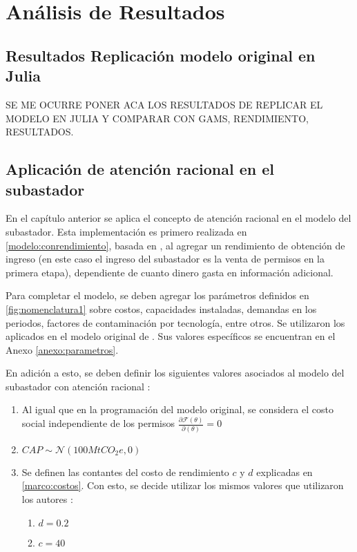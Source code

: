 
\chapter{Análisis de Resultados}
\label{c4} %

\section{Resultados Replicación modelo original en Julia}

SE ME OCURRE PONER ACA LOS RESULTADOS DE REPLICAR EL MODELO EN JULIA Y COMPARAR CON GAMS, RENDIMIENTO, RESULTADOS.

\section{Aplicación de atención racional en el subastador}

En el capítulo anterior se aplica el concepto de atención racional en el modelo del subastador. Esta implementación es primero realizada en \ref{modelo:conrendimiento}, basada en \cite{dewan_estimating_2020}, al agregar un rendimiento de obtención de ingreso (en este caso el ingreso del subastador es la venta de permisos en la primera etapa), dependiente de cuanto dinero gasta en información adicional.
\vspace{2.5mm}

Para completar el modelo, se deben agregar los parámetros definidos en \ref{fig:nomenclatura1} sobre costos, capacidades instaladas, demandas en los periodos, factores de contaminación por tecnología, entre otros. Se utilizaron los aplicados en el modelo original de \cite{amigo_two_2021}. Sus valores específicos se encuentran en el Anexo \ref{anexo:parametros}.
\vspace{2.5mm}

En adición a esto, se deben definir los siguientes valores asociados al modelo del subastador con atención racional :

\begin{enumerate}
    \item Al igual que en la programación del modelo original, se considera el costo social independiente de los permisos  $\frac{\partial\mathcal{F}(\theta)}{\partial(\theta)}=0$
    \item $CAP\sim \mathcal{N}(100MtCO_{2}e,0)$
    \item Se definen las contantes del costo de rendimiento $c$ y $d$ explicadas en \ref{marco:costos}. Con esto, se decide utilizar los mismos valores que utilizaron los autores :
    \begin{enumerate}
        \item $d = 0.2$
        \item $c = 40$
    \end{enumerate}
\end{enumerate}

